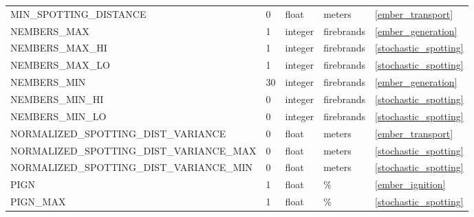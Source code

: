\begin{landscape}
\begin{center}
\begin{longtable}{lllll}
MIN\_SPOTTING\_DISTANCE                      & 0                          & float                  & meters                             & \ref{ember_transport}                \\
NEMBERS\_MAX                                 & 1                          & integer                & firebrands                         & \ref{ember_generation}               \\
NEMBERS\_MAX\_HI                             & 1                          & integer                & firebrands                         & \ref{stochastic_spotting}            \\
NEMBERS\_MAX\_LO                             & 1                          & integer                & firebrands                         & \ref{stochastic_spotting}            \\
NEMBERS\_MIN                                 & 30                         & integer                & firebrands                         & \ref{ember_generation}               \\
NEMBERS\_MIN\_HI                             & 0                          & integer                & firebrands                         & \ref{stochastic_spotting}            \\
NEMBERS\_MIN\_LO                             & 0                          & integer                & firebrands                         & \ref{stochastic_spotting}            \\
NORMALIZED\_SPOTTING\_DIST\_VARIANCE         & 0                          & float                  & meters                             & \ref{ember_transport}                \\
NORMALIZED\_SPOTTING\_DIST\_VARIANCE\_MAX    & 0                          & float                  & meters                             & \ref{stochastic_spotting}            \\
NORMALIZED\_SPOTTING\_DIST\_VARIANCE\_MIN    & 0                          & float                  & meters                             & \ref{stochastic_spotting}            \\
PIGN                                         & 1                          & float                  & \%                                 & \ref{ember_ignition}                 \\
PIGN\_MAX                                    & 1                          & float                  & \%                                 & \ref{stochastic_spotting}            \\

\end{longtable}
\end{center}
\end{landscape}
